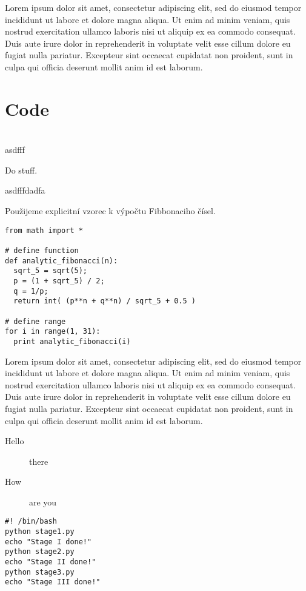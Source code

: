 \documentclass{article}
\begin{document}
Lorem ipsum dolor sit amet, consectetur adipiscing elit, sed do eiusmod tempor
incididunt ut labore et dolore magna aliqua. Ut enim ad minim veniam, quis
nostrud exercitation ullamco laboris nisi ut aliquip ex ea commodo consequat.
Duis aute irure dolor in reprehenderit in voluptate velit esse cillum dolore eu
fugiat nulla pariatur. Excepteur sint occaecat cupidatat non proident, sunt in
culpa qui officia deserunt mollit anim id est laborum.


\section{Code}

\begin{algo}[asdf]\ \\
	\AlgIn asdfff
	\begin{algorithmic}[1]
		\State Do stuff.
	\end{algorithmic}
	\AlgOut asdfffdadfa
\end{algo}

\begin{algo} Použijeme explicitní vzorec k výpočtu
	Fibbonaciho čísel.
	\begin{lstlisting}[label={list:first}]
from math import *

# define function 
def analytic_fibonacci(n):
  sqrt_5 = sqrt(5);
  p = (1 + sqrt_5) / 2;
  q = 1/p;
  return int( (p**n + q**n) / sqrt_5 + 0.5 )
 
# define range
for i in range(1, 31):
  print analytic_fibonacci(i)
\end{lstlisting}
\end{algo}
Lorem ipsum dolor sit amet, consectetur adipiscing elit, sed do eiusmod tempor
incididunt ut labore et dolore magna aliqua. Ut enim ad minim veniam, quis
nostrud exercitation ullamco laboris nisi ut aliquip ex ea commodo consequat.
Duis aute irure dolor in reprehenderit in voluptate velit esse cillum dolore eu
fugiat nulla pariatur. Excepteur sint occaecat cupidatat non proident, sunt in
culpa qui officia deserunt mollit anim id est laborum.

\begin{description}
	\item[Hello] there
	\item[How] are you
\end{description}

\begin{lstlisting}[label={list:second},caption=Sample Bash code.]
#! /bin/bash
python stage1.py
echo "Stage I done!"
python stage2.py
echo "Stage II done!"
python stage3.py
echo "Stage III done!"
\end{lstlisting}
\end{document}
